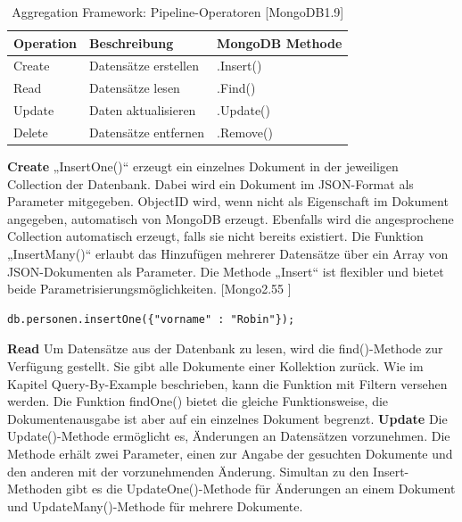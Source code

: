 \begin{table}[htb]
\begin{center}
    \begin{tabular}{| l | p{8cm} | l |}
    \hline
    \textbf{Operation} & \textbf{Beschreibung} & \textbf{MongoDB Methode} \\
    
    \hline
    Create & Datensätze erstellen & .Insert() \\
    
    \hline
	Read & Datensätze lesen & .Find() \\
	
    \hline    
    Update & Daten aktualisieren & .Update() \\ 
   
    \hline    
    Delete & Datensätze entfernen & .Remove()  \\ 
    
    \hline
    \end{tabular}
\end{center}
\caption{Aggregation Framework: Pipeline-Operatoren [MongoDB1.9]}
\end{table}

\textbf{Create}
\newline
„InsertOne()“ erzeugt ein einzelnes Dokument in der jeweiligen Collection der Datenbank. Dabei wird ein Dokument im JSON-Format als Parameter mitgegeben. ObjectID wird, wenn nicht als Eigenschaft im Dokument angegeben, automatisch von MongoDB erzeugt. Ebenfalls wird die angesprochene Collection automatisch erzeugt, falls sie nicht bereits existiert. Die Funktion „InsertMany()“  erlaubt das Hinzufügen mehrerer Datensätze über ein Array von JSON-Dokumenten als Parameter. Die Methode „Insert“ ist flexibler und bietet beide Parametrisierungsmöglichkeiten. [Mongo2.55 ]
\newline
\begin{lstlisting}
db.personen.insertOne({"vorname" : "Robin"});
\end{lstlisting}

\textbf{Read}
\newline
Um Datensätze aus der Datenbank zu lesen, wird die find()-Methode zur Verfügung gestellt. Sie gibt alle Dokumente einer Kollektion zurück. Wie im Kapitel Query-By-Example beschrieben, kann die Funktion mit Filtern versehen werden. Die Funktion findOne() bietet die gleiche Funktionsweise, die Dokumentenausgabe ist aber auf ein einzelnes Dokument begrenzt.
\newline
\textbf{Update}
\newline
Die Update()-Methode ermöglicht es, Änderungen an Datensätzen vorzunehmen.  Die Methode erhält zwei Parameter, einen zur Angabe der gesuchten Dokumente und den anderen mit  der vorzunehmenden Änderung. Simultan zu den Insert-Methoden gibt es die UpdateOne()-Methode für Änderungen an einem Dokument und UpdateMany()-Methode für mehrere Dokumente.
\newline

